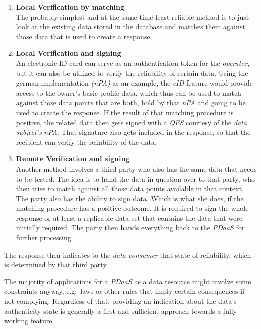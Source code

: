 \documentclass[12pt,english,a4paper,titlepage,cleardoublepage=empty,dottedtoc]{report}
\begin{document}
\begin{enumerate}
\def\labelenumi{(\arabic{enumi})}
\item
  \textbf{Local Verification by matching}\\
  The probably simplest and at the same time least reliable method is to
  just look at the existing data stored in the database and matches them
  against those data that is used to create a response.
\item
  \textbf{Local Verification and signing}\\
  An electronic ID card can serve as an authentication token for the
  \emph{operator}, but it can also be utilized to verify the reliability
  of certain data. Using the german implementation \emph{(nPA)} as an
  example, the \emph{eID} feature would provide access to the owner's
  basic profile data, which thus can be used to match against those data
  points that are both, hold by that \emph{nPA} and going to be used to
  create the response. If the result of that matching procedure is
  positive, the related data then gets signed with a \emph{QES} courtesy
  of the \emph{data subject's} \emph{nPA}. That signature also gets
  included in the response, so that the recipient can verify the
  reliability of the data.
\item
  \textbf{Remote Verification and signing}\\
  Another method involves a third party who also has the same data that
  needs to be tested. The idea is to hand the data in question over to
  that party, who then tries to match against all those data points
  available in that context. The party also has the ability to sign
  data. Which is what she does, if the matching procedure has a positive
  outcome. It is required to sign the whole response or at least a
  replicable data set that contains the data that were initially
  required. The party then hands everything back to the \emph{PDaaS} for
  further processing.
\end{enumerate}

The response then indicates to the \emph{data consumer} that state of
reliability, which is determined by that third party.

The majority of applications for a \emph{PDaaS} as a data resource might
involve some constraints anyway, e.g.~laws or other rules that imply
certain consequences if not complying. Regardless of that, providing an
indication about the data's authenticity state is generally a first and
sufficient approach towards a fully working feature.
\end{document}
